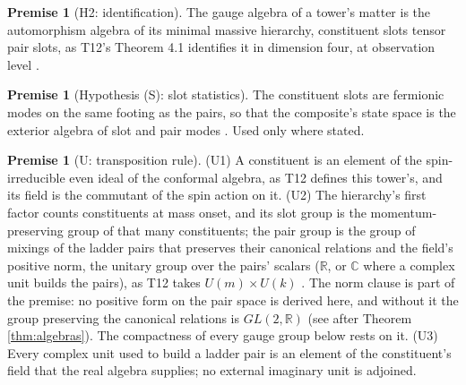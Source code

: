 \documentclass[11pt]{article}
\theoremstyle{definition}
\newtheorem{premise}[theorem]{Premise}
\newcommand{\R}{\mathbb{R}}
\newcommand{\C}{\mathbb{C}}
\begin{document}
\begin{premise}[H2: identification]\label{prem:H2}
The gauge algebra of a tower's matter is the automorphism algebra of its minimal massive hierarchy, constituent slots tensor pair slots, as T12's Theorem 4.1 identifies it in dimension four, at observation level \cite[Thm.~4.1, Prop.~4.3]{ButlerT12}.
\end{premise}

\begin{premise}[Hypothesis (S): slot statistics]\label{prem:S}
The constituent slots are fermionic modes on the same footing as the pairs, so that the composite's state space is the exterior algebra of slot and pair modes \cite[Sec.~5]{ButlerT12}. Used only where stated.
\end{premise}

\begin{premise}[U: transposition rule]\label{prem:U}
(U1) A constituent is an element of the spin-irreducible even ideal of the conformal algebra, as T12 defines this tower's, and its field is the commutant of the spin action on it. (U2) The hierarchy's first factor counts constituents at mass onset, and its slot group is the momentum-preserving group of that many constituents; the pair group is the group of mixings of the ladder pairs that preserves their canonical relations and the field's positive norm, the unitary group over the pairs' scalars ($\R$, or $\C$ where a complex unit builds the pairs), as T12 takes $U(m) \times U(k)$ \cite[Thm.~4.1]{ButlerT12}. The norm clause is part of the premise: no positive form on the pair space is derived here, and without it the group preserving the canonical relations is $GL(2,\R)$ (see after Theorem \ref{thm:algebras}). The compactness of every gauge group below rests on it. (U3) Every complex unit used to build a ladder pair is an element of the constituent's field that the real algebra supplies; no external imaginary unit is adjoined.
\end{premise}
\end{document}
